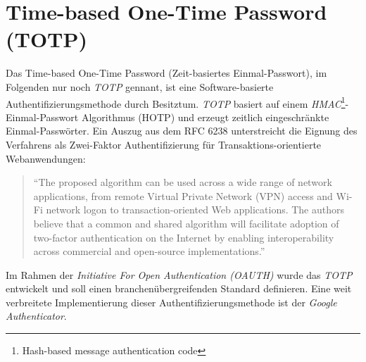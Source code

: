 \documentclass[11pt,a4paper,ngerman]{scrreprt}
\begin{document}
\section{Time-based One-Time Password (TOTP)}
Das Time-based One-Time Password (Zeit-basiertes Einmal-Passwort), im Folgenden nur noch \textit{TOTP} gennant, ist eine Software-basierte Authentifizierungsmethode durch Besitztum. \textit{TOTP} basiert auf einem \textit{HMAC}\footnote{Hash-based message authentication code}-Einmal-Passwort Algorithmus (HOTP) und erzeugt zeitlich eingeschränkte Einmal-Passwörter. Ein Auszug aus dem RFC 6238 unterstreicht die Eignung des Verfahrens als Zwei-Faktor Authentifizierung für Transaktions-orientierte Webanwendungen:
\begin{quote}
    ``The proposed algorithm can be used across a wide range of network
    applications, from remote Virtual Private Network (VPN) access and
    Wi-Fi network logon to transaction-oriented Web applications.  The
    authors believe that a common and shared algorithm will facilitate
    adoption of two-factor authentication on the Internet by enabling
    interoperability across commercial and open-source implementations.'' \cite{rfc6238}
\end{quote}
Im Rahmen der \textit{Initiative For Open Authentication (OAUTH)} wurde das \textit{TOTP} entwickelt und soll einen branchenübergreifenden Standard definieren. Eine weit verbreitete Implementierung dieser Authentifizierungsmethode ist der \textit{Google Authenticator}.
\end{document}
